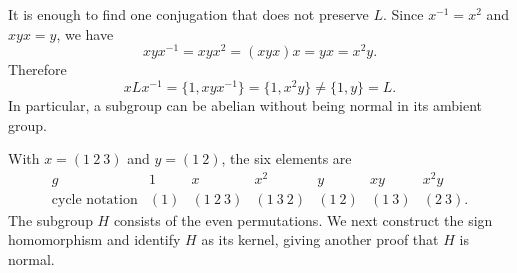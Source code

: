 \documentclass[reqno,11pt]{amsart}
\begin{document}
\begin{example}
It is enough to find one conjugation that does not preserve $L$.
Since $x^{-1}=x^2$ and $xyx=y$, we have
\[
  xyx^{-1}=xyx^2=(xyx)x=yx=x^2y.
\]
Therefore
\[
  xLx^{-1}=\{1,xyx^{-1}\}=\{1,x^2y\}\neq\{1,y\}=L.
\]
In particular, a subgroup can be abelian without being normal in its
ambient group.
\end{example}

With $x=(1\ 2\ 3)$ and $y=(1\ 2)$, the six elements are
\[
\begin{array}{c|cccccc}
  g&1&x&x^2&y&xy&x^2y\\ \hline
  \text{cycle notation}&(1)&(1\ 2\ 3)&(1\ 3\ 2)&(1\ 2)&(1\ 3)&(2\ 3).
\end{array}
\]
The subgroup $H$ consists of the even permutations. We next construct the
sign homomorphism and identify $H$ as its kernel, giving another proof
that $H$ is normal.
\end{document}
